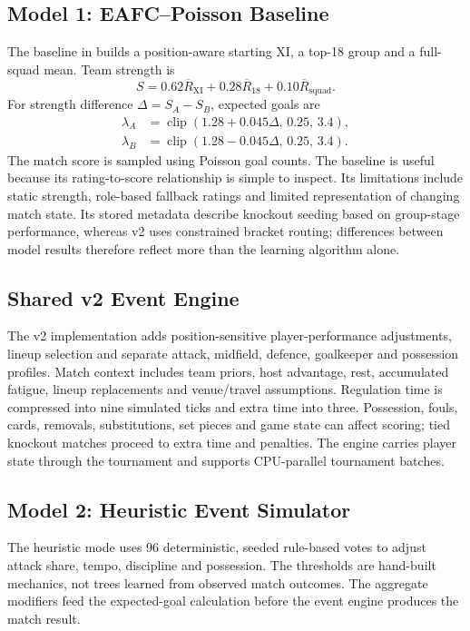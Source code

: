 \documentclass[11pt,a4paper]{article}
\begin{document}
\subsection{Model 1: EAFC--Poisson Baseline}
The baseline in  builds a position-aware starting
XI, a top-18 group and a full-squad mean. Team strength is
\begin{equation}
S=0.62\overline R_{\mathrm{XI}}+0.28\overline R_{18}
  +0.10\overline R_{\mathrm{squad}}.
\end{equation}
For strength difference $\Delta=S_A-S_B$, expected goals are
\begin{align}
\lambda_A&=\operatorname{clip}(1.28+0.045\Delta,\,0.25,\,3.4),\\
\lambda_B&=\operatorname{clip}(1.28-0.045\Delta,\,0.25,\,3.4).
\end{align}
The match score is sampled using Poisson goal counts. The baseline is useful
because its rating-to-score relationship is simple to inspect. Its limitations
include static strength, role-based fallback ratings and limited representation
of changing match state. Its stored metadata describe knockout seeding based on
group-stage performance, whereas v2 uses constrained bracket routing; differences
between model results therefore reflect more than the learning algorithm alone.

\subsection{Shared v2 Event Engine}
The v2 implementation adds position-sensitive player-performance adjustments,
lineup selection and separate attack, midfield, defence, goalkeeper and
possession profiles. Match context includes team priors, host advantage,
rest, accumulated fatigue, lineup replacements and venue/travel assumptions.
Regulation time is compressed into nine simulated ticks and extra time into
three. Possession, fouls, cards, removals, substitutions, set pieces and game
state can affect scoring; tied knockout matches proceed to extra time and
penalties. The engine carries player state through the tournament and supports
CPU-parallel tournament batches.
\clearpage
\subsection{Model 2: Heuristic Event Simulator}
The heuristic mode uses 96 deterministic, seeded rule-based votes to adjust
attack share, tempo, discipline and possession. The thresholds are hand-built
mechanics, not trees learned from observed match outcomes. The aggregate
modifiers feed the expected-goal calculation before the event engine produces
the match result.
\end{document}
